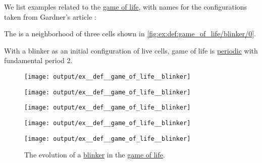 \begin{example}\label{ex:def:game_of_life}
  We list examples related to the \hyperref[def:game_of_life]{game of life}, with names for the configurations taken from Gardner's article \cite[120]{Gardner1970GameOfLife}:
  \begin{thmenum}
     The  is a neighborhood of three cells shown in \cref{fig:ex:def:game_of_life/blinker/0}.

    With a blinker as an initial configuration of live cells, game of life is \hyperref[def:dynamical_system_periodicity]{periodic} with fundamental period \( 2 \).

    \begin{figure}[!ht]
      \begin{subcaptionblock}{0.15\textwidth}
        \centering
        \texttt{[image: output/ex\_\_def\_\_game\_of\_life\_\_blinker]}
        \caption{\( t = 0 \)}\label{fig:ex:def:game_of_life/blinker/0}
      \end{subcaptionblock}
      \hfill
      \begin{subcaptionblock}{0.15\textwidth}
        \centering
        \texttt{[image: output/ex\_\_def\_\_game\_of\_life\_\_blinker]}
        \caption{\( t = 1 \)}\label{fig:ex:def:game_of_life/blinker/1}
      \end{subcaptionblock}
      \hfill
      \begin{subcaptionblock}{0.15\textwidth}
        \centering
        \texttt{[image: output/ex\_\_def\_\_game\_of\_life\_\_blinker]}
        \caption{\( t = 2 \)}\label{fig:ex:def:game_of_life/blinker/2}
      \end{subcaptionblock}
      \hfill
      \begin{subcaptionblock}{0.15\textwidth}
        \centering
        \texttt{[image: output/ex\_\_def\_\_game\_of\_life\_\_blinker]}
        \caption{\( t = 3 \)}\label{fig:ex:def:game_of_life/blinker/3}
      \end{subcaptionblock}
      \hfill
      \begin{subcaptionblock}{0.15\textwidth}
        \centering
        \texttt{[image: output/ex\_\_def\_\_game\_of\_life\_\_blinker]}
        \caption{\( t = 4 \)}\label{fig:ex:def:game_of_life/blinker/4}
      \end{subcaptionblock}
      \caption{The evolution of a \hyperref[ex:def:game_of_life/blinker]{blinker} in the \hyperref[def:game_of_life]{game of life}.}\label{fig:ex:def:game_of_life/blinker}
    \end{figure}


\end{thmenum}
\end{example}
